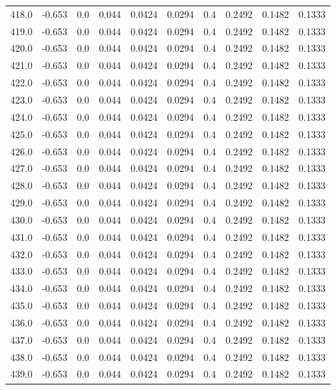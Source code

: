 \begin{longtable}{lrrrrrrrrr}
418.0 & -0.653 & 0.0 & 0.044 & 0.0424 & 0.0294 & 0.4 & 0.2492 & 0.1482 & 0.1333 \\
419.0 & -0.653 & 0.0 & 0.044 & 0.0424 & 0.0294 & 0.4 & 0.2492 & 0.1482 & 0.1333 \\
420.0 & -0.653 & 0.0 & 0.044 & 0.0424 & 0.0294 & 0.4 & 0.2492 & 0.1482 & 0.1333 \\
421.0 & -0.653 & 0.0 & 0.044 & 0.0424 & 0.0294 & 0.4 & 0.2492 & 0.1482 & 0.1333 \\
422.0 & -0.653 & 0.0 & 0.044 & 0.0424 & 0.0294 & 0.4 & 0.2492 & 0.1482 & 0.1333 \\
423.0 & -0.653 & 0.0 & 0.044 & 0.0424 & 0.0294 & 0.4 & 0.2492 & 0.1482 & 0.1333 \\
424.0 & -0.653 & 0.0 & 0.044 & 0.0424 & 0.0294 & 0.4 & 0.2492 & 0.1482 & 0.1333 \\
425.0 & -0.653 & 0.0 & 0.044 & 0.0424 & 0.0294 & 0.4 & 0.2492 & 0.1482 & 0.1333 \\
426.0 & -0.653 & 0.0 & 0.044 & 0.0424 & 0.0294 & 0.4 & 0.2492 & 0.1482 & 0.1333 \\
427.0 & -0.653 & 0.0 & 0.044 & 0.0424 & 0.0294 & 0.4 & 0.2492 & 0.1482 & 0.1333 \\
428.0 & -0.653 & 0.0 & 0.044 & 0.0424 & 0.0294 & 0.4 & 0.2492 & 0.1482 & 0.1333 \\
429.0 & -0.653 & 0.0 & 0.044 & 0.0424 & 0.0294 & 0.4 & 0.2492 & 0.1482 & 0.1333 \\
430.0 & -0.653 & 0.0 & 0.044 & 0.0424 & 0.0294 & 0.4 & 0.2492 & 0.1482 & 0.1333 \\
431.0 & -0.653 & 0.0 & 0.044 & 0.0424 & 0.0294 & 0.4 & 0.2492 & 0.1482 & 0.1333 \\
432.0 & -0.653 & 0.0 & 0.044 & 0.0424 & 0.0294 & 0.4 & 0.2492 & 0.1482 & 0.1333 \\
433.0 & -0.653 & 0.0 & 0.044 & 0.0424 & 0.0294 & 0.4 & 0.2492 & 0.1482 & 0.1333 \\
434.0 & -0.653 & 0.0 & 0.044 & 0.0424 & 0.0294 & 0.4 & 0.2492 & 0.1482 & 0.1333 \\
435.0 & -0.653 & 0.0 & 0.044 & 0.0424 & 0.0294 & 0.4 & 0.2492 & 0.1482 & 0.1333 \\
436.0 & -0.653 & 0.0 & 0.044 & 0.0424 & 0.0294 & 0.4 & 0.2492 & 0.1482 & 0.1333 \\
437.0 & -0.653 & 0.0 & 0.044 & 0.0424 & 0.0294 & 0.4 & 0.2492 & 0.1482 & 0.1333 \\
438.0 & -0.653 & 0.0 & 0.044 & 0.0424 & 0.0294 & 0.4 & 0.2492 & 0.1482 & 0.1333 \\
439.0 & -0.653 & 0.0 & 0.044 & 0.0424 & 0.0294 & 0.4 & 0.2492 & 0.1482 & 0.1333 \\

\end{longtable}

